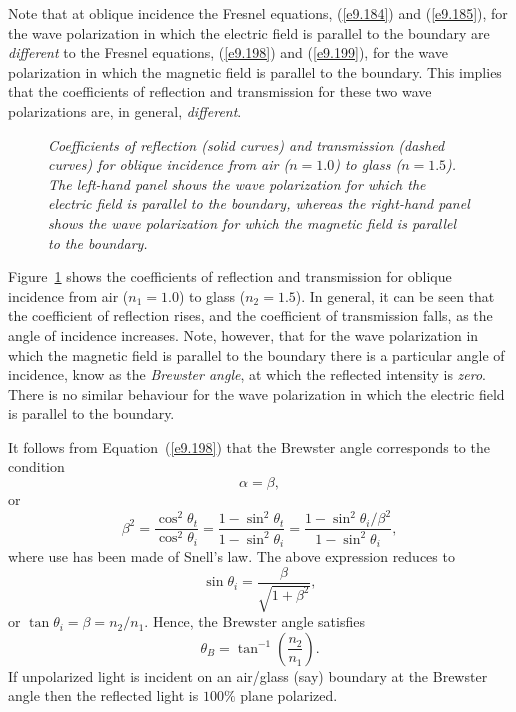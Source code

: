 Note that at oblique incidence the Fresnel equations, (\ref{e9.184}) and
(\ref{e9.185}), for the wave polarization in which the electric
field is parallel to the boundary are {\em different} to the Fresnel equations,
(\ref{e9.198}) and (\ref{e9.199}), for the wave polarization
in which the magnetic field is parallel to the boundary. This implies that
the coefficients of reflection and transmission for these two wave polarizations
are, in general, {\em different}.

\begin{figure}
\epsfysize=2.25in
\centerline{}
\caption{\em Coefficients of reflection (solid curves) and transmission (dashed curves) for oblique incidence from air ($n=1.0$) to
glass ($n=1.5$). The left-hand panel shows the wave polarization
for which the electric field is parallel to the boundary, whereas the
right-hand panel shows the wave polarization for which the
magnetic field is parallel to the boundary.}\label{ffresnel}
\end{figure}

Figure~\ref{ffresnel} shows the coefficients of reflection and transmission
for oblique incidence from air ($n_1=1.0$) to
glass ($n_2=1.5$).  In general, it can
be seen that the coefficient of reflection rises, and the coefficient of
transmission falls, as the angle of incidence increases. Note, however,
that for the wave polarization in which the magnetic field is parallel to the boundary there is a particular angle of incidence,
know as the {\em Brewster angle},
at which the reflected intensity is {\em zero}. There is no similar behaviour for
the wave polarization in which the electric field is parallel to the boundary. 

It follows from Equation~(\ref{e9.198}) that the Brewster angle corresponds
to the condition
\begin{equation}
\alpha=\beta,
\end{equation}
or
\begin{equation}
\beta^2 = \frac{\cos^2\theta_t}{\cos^2\theta_i} = \frac{1-\sin^2\theta_t}{1-\sin^2\theta_i}=\frac{1-\sin^2\theta_i/\beta^2}{1-\sin^2\theta_i},
\end{equation}
where use has been made of Snell's law. The above expression
reduces to
\begin{equation}
\sin\theta_i = \frac{\beta}{\sqrt{1+\beta^2}},
\end{equation}
or $\tan\theta_i = \beta = n_2/n_1$. Hence, the Brewster angle satisfies
\begin{equation}
\theta_B = \tan^{-1}\left(\frac{n_2}{n_1}\right).
\end{equation}
If unpolarized light is incident on an air/glass (say) boundary at the Brewster angle
then the reflected light is $100\%$ plane polarized.

